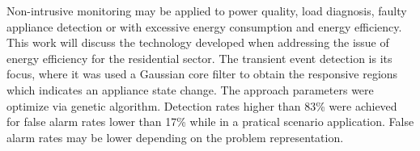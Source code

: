 \begin{foreignabstract}

Non-intrusive monitoring may be applied to power quality, load
diagnosis, faulty appliance detection or with excessive energy
consumption and energy efficiency. This work will discuss the
technology developed when addressing the issue of energy efficiency
for the residential sector. The transient event detection is its
focus, where it was used a Gaussian core filter to obtain the
responsive regions which indicates an appliance state change. The
approach parameters were optimize via genetic algorithm. %
Detection rates higher than 83\% were achieved for
false alarm rates lower than 17\% while in a pratical
scenario application. False alarm rates may be lower depending on 
the problem representation.

\end{foreignabstract}

